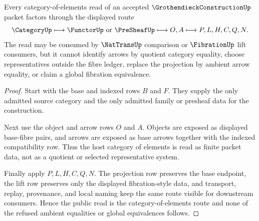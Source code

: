 \begin{theorem}
\label{thm:grothendieck-construction-category-of-elements-route}
Every category-of-elements read of an accepted $\GrothendieckConstructionUp$ packet factors through the displayed route
$$
\CategoryUp \longmapsto \FunctorUp\text{ or }\PreSheafUp \longmapsto O,A \longmapsto P,L,H,C,Q,N.
$$
The read may be consumed by $\NatTransUp$ comparison or $\FibrationUp$ lift consumers, but it cannot identify arrows by quotient category equality, choose representatives outside the fibre ledger, replace the projection by ambient arrow equality, or claim a global fibration equivalence.
\end{theorem}
\begin{proof}
Start with the base and indexed rows $B$ and $F$. They supply the only admitted source category and the only admitted family or presheaf data for the construction.

Next use the object and arrow rows $O$ and $A$. Objects are exposed as displayed base-fibre pairs, and arrows are exposed as base arrows together with the indexed compatibility row. Thus the host category of elements is read as finite packet data, not as a quotient or selected representative system.

Finally apply $P,L,H,C,Q,N$. The projection row preserves the base endpoint, the lift row preserves only the displayed fibration-style data, and transport, replay, provenance, and local naming keep the same route visible for downstream consumers. Hence the public read is the category-of-elements route and none of the refused ambient equalities or global equivalences follows.
\end{proof}


\begin{closurestatus}{\GrothendieckConstructionUp}
  \theoryclosure{\seedClosure}
  \formalstatus{\unformalizedV}
\end{closurestatus}
